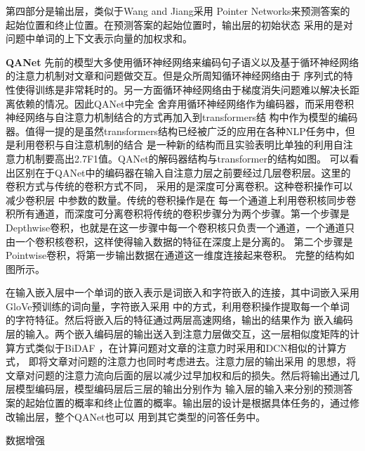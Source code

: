 第四部分是输出层，类似于Wang and Jiang采用
Pointer Networks来预测答案的起始位置和终止位置。在预测答案的起始位置时，输出层的初始状态
采用的是对问题中单词的上下文表示向量的加权求和。

\textbf{ QANet}
先前的模型大多使用循环神经网络来编码句子语义以及基于循环神经网络的注意力机制对文章和问题做交互。但是众所周知循环神经网络由于
序列式的特性使得训练是非常耗时的。另一方面循环神经网络由于梯度消失问题难以解决长距离依赖的情况。因此QANet中完全
舍弃用循环神经网络作为编码器，而采用卷积神经网络与自注意力机制结合的方式再加入到transformers结
构中作为模型的编码器。值得一提的是虽然transformers结构已经被广泛的应用在各种NLP任务中，但是利用卷积与自注意机制的结合
是一种新的结构而且实验表明比单独的利用自注意力机制要高出2.7F1值。QANet的解码器结构与transformer的结构如图。
可以看出区别在于QANet中的编码器在输入自注意力层之前要经过几层卷积层。这里的卷积方式与传统的卷积方式不同，
采用的是深度可分离卷积。这种卷积操作可以减少卷积层
中参数的数量。传统的卷积操作是在
每一个通道上利用卷积核同步卷积所有通道，而深度可分离卷积将传统的卷积步骤分为两个步骤。第一个步骤是
Depthwise卷积，也就是在这一步骤中每一个卷积核只负责一个通道，一个通道只由一个卷积核卷积，这样使得输入数据的特征在深度上是分离的。
第二个步骤是Pointwise卷积，将第一步输出数据在通道这一维度连接起来卷积。
完整的结构如图所示。

在输入嵌入层中一个单词的嵌入表示是词嵌入和字符嵌入的连接，其中词嵌入采用GloVe预训练的词向量，字符嵌入采用
中的方式，利用卷积操作提取每一个单词的字符特征。然后将嵌入后的特征通过两层高速网络，输出的结果作为
嵌入编码层的输入。两个嵌入编码层的输出送入到注意力层做交互，这一层相似度矩阵的计算方式类似于BiDAF
，在计算问题对文章的注意力时采用和DCN相似的计算方式，
即将文章对问题的注意力也同时考虑进去。注意力层的输出采用
的思想，将文章对问题的注意力流向后面的层以减少过早加权和后的损失。然后将输出通过几层模型编码层，模型编码层后三层的输出分别作为
输入层的输入来分别的预测答案的起始位置的概率和终止位置的概率。输出层的设计是根据具体任务的，通过修改输出层，整个QANet也可以
用到其它类型的问答任务中。

数据增强
